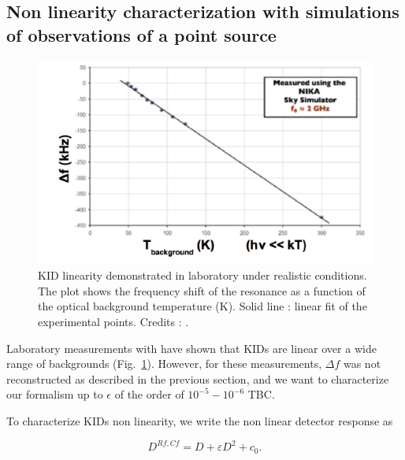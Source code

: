 
\subsection{Non linearity characterization with simulations of observations of a point source}

\begin{figure}
\center
\includegraphics[clip, angle=0, width=\columnwidth]{Figures/KID-linearity-Monfardini2014.png}
\caption{KID linearity demonstrated in laboratory under realistic
  conditions. The plot shows the frequency shift of the resonance as a function
  of the optical background temperature (K). Solid line : linear fit of the
  experimental points. Credits : \citet{2014JLTP..176..787M}.}
\label{fig:KID-lin}
\end{figure}

Laboratory measurements with  have shown that
KIDs are linear over a wide range of backgrounds
(Fig.~\ref{fig:KID-lin}). However, for these measurements, $\Delta f$ was not
reconstructed as described in the previous section, and we want to characterize
our formalism up to $\epsilon$ of the order of $10^{-5}-10^{-6} $ TBC.

To characterize KIDs non linearity, we write the non linear detector response as 

\begin{equation}
D^{Rf,Cf} = D + \varepsilon D^2 +c_{0}.
\label{eq:model_kid_nl}
\end{equation}

